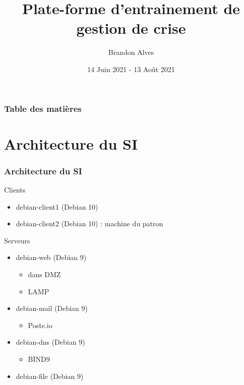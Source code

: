 \documentclass{beamer}
\title[Audit]{Plate-forme d'entrainement de gestion de crise}
\author{Brandon Alves}
\institute[INSA Lyon]{
	INSA Lyon \\
	\medskip
	INRIA
}
\date{14 Juin 2021 - 13 Août 2021}
\begin{document}
	\begin{frame}
		\titlepage
	\end{frame}
	\begin{frame}
		\frametitle{Table des matières}
		\tableofcontents
	\end{frame}
	\section{Architecture du SI}
		\begin{frame}
			\frametitle{Architecture du SI}
			\begin{block}{Clients}
				\begin{itemize}
					\item debian-client1 (Debian 10)
					\item debian-client2 (Debian 10) : machine du patron
				\end{itemize}
			\end{block}
			\begin{block}{Serveurs}
				\begin{itemize}
					\item debian-web (Debian 9)
					\begin{itemize}
						\item dans DMZ
						\item LAMP
					\end{itemize}
					\item debian-mail (Debian 9)
					\begin{itemize}
						\item Poste.io
					\end{itemize}
					\item debian-dns (Debian 9)
					\begin{itemize}
						\item BIND9
					\end{itemize}
					\item debian-file (Debian 9)
				\end{itemize}
			\end{block}
		\end{frame}
\end{document}
